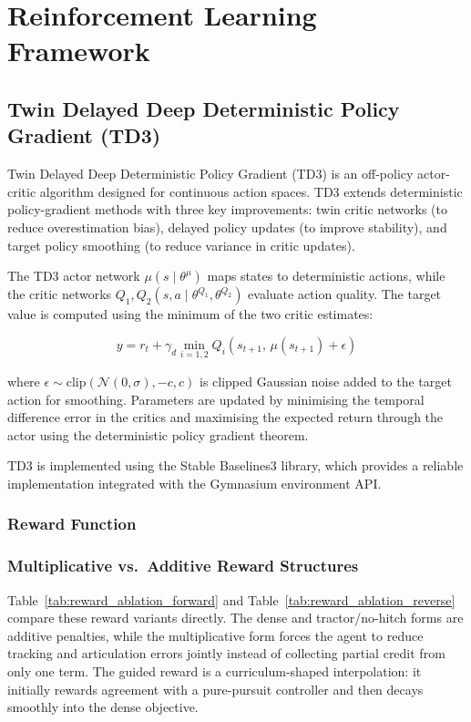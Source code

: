 \chapter{Reinforcement Learning Framework}
\label{ch:rl_framework}

\section{Twin Delayed Deep Deterministic Policy Gradient (TD3)}

Twin Delayed Deep Deterministic Policy Gradient (TD3) is an off-policy actor-critic algorithm designed for continuous action spaces. TD3 extends deterministic policy-gradient methods with three key improvements: twin critic networks (to reduce overestimation bias), delayed policy updates (to improve stability), and target policy smoothing (to reduce variance in critic updates).

The TD3 actor network $\mu(s \mid \theta^\mu)$ maps states to deterministic actions, while the critic networks $Q_1, Q_2(s, a \mid \theta^{Q_1}, \theta^{Q_2})$ evaluate action quality. The target value is computed using the minimum of the two critic estimates:

\begin{equation}
    y = r_t + \gamma_d \min_{i=1,2} Q_i(s_{t+1},\, \mu(s_{t+1}) + \epsilon)
    \label{eq:td3_target}
\end{equation}

where $\epsilon \sim \text{clip}(\mathcal{N}(0, \sigma), -c, c)$ is clipped Gaussian noise added to the target action for smoothing. Parameters are updated by minimising the temporal difference error in the critics and maximising the expected return through the actor using the deterministic policy gradient theorem.

TD3 is implemented using the Stable Baselines3 library, which provides a reliable implementation integrated with the Gymnasium environment API.

\subsection{Reward Function}


\subsection{Multiplicative vs.\ Additive Reward Structures}

Table~\ref{tab:reward_ablation_forward} and Table~\ref{tab:reward_ablation_reverse} compare these reward variants directly. The dense and tractor/no-hitch forms are additive penalties, while the multiplicative form forces the agent to reduce tracking and articulation errors jointly instead of collecting partial credit from only one term. The guided reward is a curriculum-shaped interpolation: it initially rewards agreement with a pure-pursuit controller and then decays smoothly into the dense objective.

